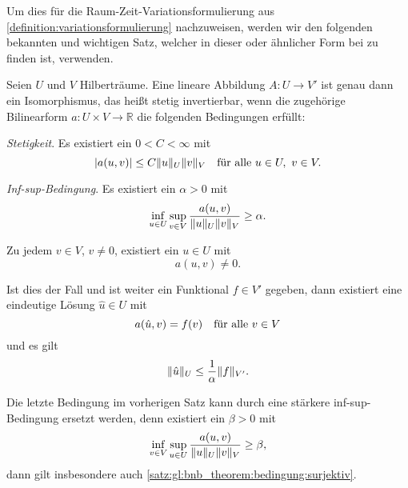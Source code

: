 Um dies für die Raum-Zeit-Variationsformulierung aus \cref{definition:variationsformulierung} nachzuweisen, werden wir den folgenden bekannten und wichtigen Satz, welcher in dieser oder ähnlicher Form bei \textcites[Theorem 2.1]{Babuska:1971fx}[Theorem 5.2.1]{Aziz:2014wf}[Theorem \S{}3.3.6]{Braess:2007wm} zu finden ist, verwenden.

\begin{Satz}
\label{satz:gl:bnb_theorem}
    Seien $U$ und $V$ Hilberträume.
    Eine lineare Abbildung $A \colon U \to V'$ ist genau dann ein Isomorphismus, das heißt stetig invertierbar, wenn die zugehörige Bilinearform $a \colon U \times V \to \mathbb{R}$ die folgenden Bedingungen erfüllt:
    \begin{thmenumerate}
        \item \label{satz:gl:bnb_theorem:bedingung:stetig}
        \emph{Stetigkeit}.
        Es existiert ein $0 < C < \infty$ mit
        \begin{equation}
            \abs{a(u, v)} \leq C \norm{u}_{U} \norm{v}_{V} \quad \fa u \in U,~v\in V.
        \end{equation}
        \item \label{satz:gl:bnb_theorem:bedingung:inf_sup}
        \emph{Inf-sup-Bedingung}.
        Es existiert ein $\alpha > 0$ mit
        \begin{equation}
            \inf_{u \in U} \sup_{v \in V} \frac{a(u, v)}{\norm{u}_{U} \norm{v}_{V}} \geq \alpha.
        \end{equation}
        \item \label{satz:gl:bnb_theorem:bedingung:surjektiv}
        Zu jedem $v \in V$, $v \neq 0$, existiert ein $u \in U$ mit
        \begin{equation}
            a(u, v) \neq 0.
        \end{equation}
    \end{thmenumerate}
    Ist dies der Fall und ist weiter ein Funktional $f \in V'$ gegeben, dann existiert eine eindeutige Lösung $\hat u \in U$ mit
    \begin{equation}
        a(\hat u, v) = f(v) \quad \fa v \in V
    \end{equation}
    und es gilt
    \begin{equation}
        \norm{\hat u}_{U} \leq \frac{1}{\alpha} \norm{f}_{V'}.
    \end{equation}
\end{Satz}

\begin{Bemerkung}
    Die letzte Bedingung im vorherigen Satz kann durch eine stärkere inf-sup-Bedingung ersetzt werden, denn existiert ein $\beta > 0$ mit
    \begin{equation}
        \inf_{v \in V} \sup_{u \in U} \frac{a(u, v)}{\norm{u}_{U} \norm{v}_{V}} \geq \beta,
    \end{equation}
    dann gilt insbesondere auch \ref{satz:gl:bnb_theorem:bedingung:surjektiv}.
\end{Bemerkung}

